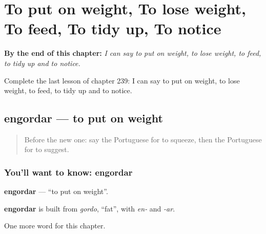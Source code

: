 
\chapter{To put on weight, To lose weight, To feed, To tidy up, To notice}
\label{ch:pt-to-put-on-weight-to-lose-weight-to-feed-to-tidy-up-to-notice}

\begin{chapteropening}
\textbf{By the end of this chapter:} \emph{I can say to put on weight, to lose weight, to feed, to tidy up and to notice.}

Complete the last lesson of chapter 239: I can say to put on weight, to lose weight, to feed, to tidy up and to notice.
\end{chapteropening}

\section[engordar]{engordar — to put on weight}

\label{lesson:PT-C239-engordar}



\begin{quote}
Before the new one: say the Portuguese for to squeeze, then the Portuguese for to suggest.
\end{quote}

\subsection*{You'll want to know: engordar}
\textbf{engordar} — \textquotedblleft{}to put on weight\textquotedblright{}.

\begin{cousinweb}
\textbf{engordar} is built from \emph{gordo}, \textquotedblleft{}fat\textquotedblright{}, with \emph{en-} and \emph{-ar}.
\end{cousinweb}

\begin{grammarlens}[title={What you've built}]
One more word for this chapter.
\end{grammarlens}

